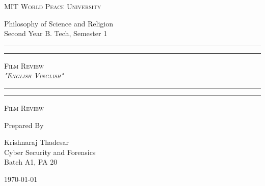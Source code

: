 \documentclass[11pt]{article}
\begin{document}
\begin{titlepage}
	\centering


	\huge\textsc{
		MIT World Peace University
	}\\

	\vspace{0.75\baselineskip} %

	\LARGE{
		Philosophy of Science and Religion\\
		Second Year B. Tech, Semester 1
	}

	\vfill %


	\rule{\textwidth}{1.6pt}\vspace*{-\baselineskip}\vspace*{2pt}
	\rule{\textwidth}{0.6pt}
	\vspace{0.75\baselineskip} %



	\huge{\textsc{
			Film Review\\
			\textit{"English Vinglish"}
		}} \\



	\vspace{0.5\baselineskip} %
	\rule{\textwidth}{0.6pt}\vspace*{-\baselineskip}\vspace*{2.8pt}
	\rule{\textwidth}{1.6pt}

	\vspace{1\baselineskip} %


	\LARGE\textsc{
		Film Review
	} %
	\vfill


	Prepared By
	\vspace{0.5\baselineskip} %

	\Large{
		Krishnaraj Thadesar \\
		Cyber Security and Forensics\\
		Batch A1, PA 20
	}


	\vspace{0.5\baselineskip} %
	\today

\end{titlepage}
\end{document}
